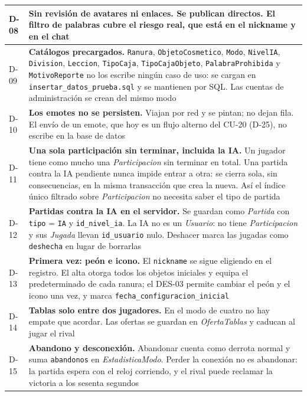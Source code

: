 \begin{center}
\begin{longtable}{|L{0.082\textwidth}|L{0.818\textwidth}|}
\mbox{D-08} & \textbf{Sin revisión de avatares ni enlaces.} Se publican directos. El filtro de palabras cubre el riesgo real, que está en el nickname y en el chat \\ \hline
\mbox{D-09} & \textbf{Catálogos precargados.} \texttt{Ranura}, \texttt{ObjetoCosmetico}, \texttt{Modo}, \texttt{NivelIA}, \texttt{Division}, \texttt{Leccion}, \texttt{TipoCaja}, \texttt{TipoCajaObjeto}, \texttt{PalabraProhibida} y \texttt{MotivoReporte} no los escribe ningún caso de uso: se cargan en \texttt{insertar\_\allowbreak{}datos\_\allowbreak{}prueba.sql} y se mantienen por SQL. Las cuentas de administración se crean del mismo modo \\ \hline
\mbox{D-10} & \textbf{Los emotes no se persisten.} Viajan por red y se pintan; no dejan fila. El envío de un emote, que hoy es un flujo alterno del \mbox{CU-20} (\mbox{D-25}), no escribe en la base de datos \\ \hline
\mbox{D-11} & \textbf{Una sola participación sin terminar, incluida la IA.} Un jugador tiene como mucho una \textit{Participacion} sin terminar en total. Una partida contra la IA pendiente nunca impide entrar a otra: se cierra sola, sin consecuencias, en la misma transacción que crea la nueva. Así el índice único filtrado sobre \textit{Participacion} no necesita saber el tipo de partida \\ \hline
\mbox{D-12} & \textbf{Partidas contra la IA en el servidor.} Se guardan como \textit{Partida} con \texttt{tipo} = \texttt{IA} y \texttt{id\_\allowbreak{}nivel\_\allowbreak{}ia}. La IA no es un \textit{Usuario}: no tiene \textit{Participacion} y sus \textit{Jugada} llevan \texttt{id\_\allowbreak{}usuario} nulo. Deshacer marca las jugadas como \texttt{deshecha} en lugar de borrarlas \\ \hline
\mbox{D-13} & \textbf{Primera vez: peón e icono.} El \texttt{nickname} se sigue eligiendo en el registro. El alta otorga todos los objetos iniciales y equipa el predeterminado de cada ranura; el \mbox{DES-03} permite cambiar el peón y el icono una vez, y marca \texttt{fecha\_\allowbreak{}configuracion\_\allowbreak{}inicial} \\ \hline
\mbox{D-14} & \textbf{Tablas solo entre dos jugadores.} En el modo de cuatro no hay empate que acordar. Las ofertas se guardan en \textit{OfertaTablas} y caducan al jugar el rival \\ \hline
\mbox{D-15} & \textbf{Abandono y desconexión.} Abandonar cuenta como derrota normal y suma \texttt{abandonos} en \textit{EstadisticaModo}. Perder la conexión no es abandonar: la partida espera con el reloj corriendo, y el rival puede reclamar la victoria a los sesenta segundos \\ \hline

\end{longtable}
\end{center}
